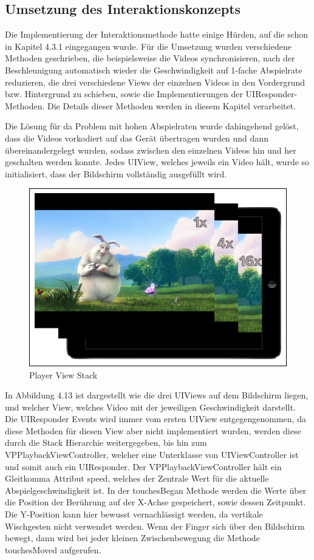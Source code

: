 \documentclass[11pt,a4paper]{report}
\begin{document}
\subsection{Umsetzung des Interaktionskonzepts}

Die Implementierung der Interaktionsmethode hatte einige Hürden, auf die schon in Kapitel 4.3.1 eingegangen wurde. Für die Umsetzung wurden verschiedene Methoden geschrieben, die beispielsweise die Videos synchronisieren, nach der Beschleunigung automatisch wieder die Geschwindigkeit auf 1-fache Abspielrate reduzieren, die drei verschiedene Views der einzelnen Videos in den Vordergrund bzw. Hintergrund zu schieben, sowie die Implementierungen der UIResponder-Methoden. Die Details dieser Methoden werden in diesem Kapitel verarbeitet.

Die Lösung für da Problem mit hohen Abspielraten wurde dahingehend gelöst, dass die Videos vorkodiert auf das Gerät übertragen wurden und dann übereinandergelegt wurden, sodass zwischen den einzelnen Videos hin und her geschalten werden konnte. Jedes UIView, welches jeweils ein Video hält, wurde so initialisiert, dass der Bildschirm vollständig ausgefüllt wird.
\begin{figure}[h]
\begin{center}
\includegraphics[scale=1.1]{./images/28.png}
\caption{Player View Stack}
\label{player_view_stack}
\end{center}
\end{figure}
In Abbildung 4.13 ist dargestellt wie die drei UIViews auf dem Bildschirm liegen, und welcher View, welches Video mit der jeweiligen Geschwindigkeit darstellt. Die UIResponder Events wird immer vom ersten UIView entgegengenommen, da diese Methoden für diesen View aber nicht implementiert wurden, werden diese durch die Stack Hierarchie weitergegeben, bis hin zum VPPlaybackViewController, welcher eine Unterklasse von UIViewController ist und somit auch ein UIResponder. Der VPPlaybackViewController hält ein Gleitkomma Attribut speed, welches der Zentrale Wert für die aktuelle Abspielgeschwindigkeit ist. In der touchesBegan Methode werden die Werte über die Position der Berührung auf der X-Achse gespeichert, sowie dessen Zeitpunkt. Die Y-Position kann hier bewusst vernachlässigt werden, da vertikale Wischgesten nicht verwendet werden. Wenn der Finger sich über den Bildschirm bewegt, dann wird bei jeder kleinen Zwischenbewegung die Methode touchesMoved aufgerufen.
\end{document}
